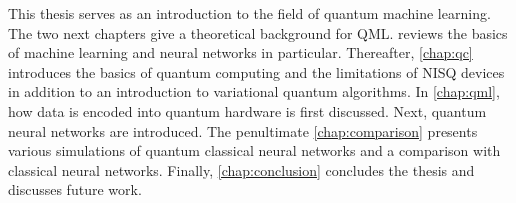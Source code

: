 This thesis serves as an introduction to the field of quantum machine learning.
The two next chapters give a theoretical background for QML.
 reviews the basics of machine learning and neural networks in particular.
Thereafter, \cref{chap:qc} introduces the basics of quantum computing and the limitations of NISQ devices in addition to an introduction to variational quantum algorithms.
In \cref{chap:qml}, how data is encoded into quantum hardware is first discussed. Next, quantum neural networks are introduced.
The penultimate \cref{chap:comparison} presents various simulations of quantum classical neural networks and a comparison with classical neural networks.
Finally, \cref{chap:conclusion} concludes the thesis and discusses future work.




